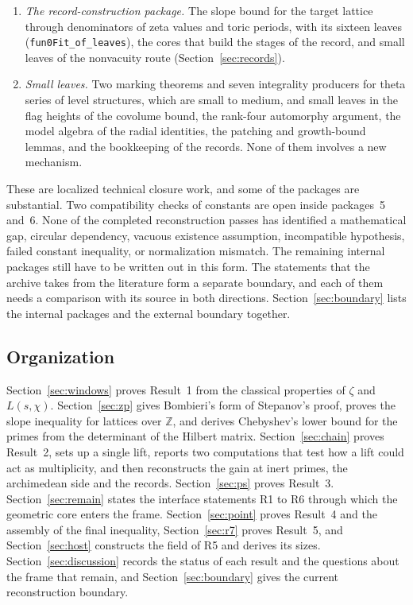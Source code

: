 \documentclass[11pt,letterpaper]{article}
\numberwithin{equation}{section}
\begin{document}
\begin{enumerate}
\item \emph{The record-construction package.} The slope bound for the target lattice through denominators of zeta values and toric periods, with its sixteen leaves (\texttt{fun0Fit\_of\_leaves}), the cores that build the stages of the record, and small leaves of the nonvacuity route (Section~\ref{sec:records}).
\item \emph{Small leaves.} Two marking theorems and seven integrality producers for theta series of level structures, which are small to medium, and small leaves in the flag heights of the covolume bound, the rank-four automorphy argument, the model algebra of the radial identities, the patching and growth-bound lemmas, and the bookkeeping of the records. None of them involves a new mechanism.
\end{enumerate}
These are localized technical closure work, and some of the packages are substantial. Two compatibility checks of constants are open inside packages~5 and~6. None of the completed reconstruction passes has identified a mathematical gap, circular dependency, vacuous existence assumption, incompatible hypothesis, failed constant inequality, or normalization mismatch. The remaining internal packages still have to be written out in this form. The statements that the archive takes from the literature form a separate boundary, and each of them needs a comparison with its source in both directions. Section~\ref{sec:boundary} lists the internal packages and the external boundary together.

\subsection{Organization}

Section~\ref{sec:windows} proves Result~1 from the classical properties of $\zeta$ and $L(s,\chi)$. Section~\ref{sec:zp} gives Bombieri's form of Stepanov's proof, proves the slope inequality for lattices over $\mathbb Z$, and derives Chebyshev's lower bound for the primes from the determinant of the Hilbert matrix. Section~\ref{sec:chain} proves Result~2, sets up a single lift, reports two computations that test how a lift could act as multiplicity, and then reconstructs the gain at inert primes, the archimedean side and the records. Section~\ref{sec:ps} proves Result~3. Section~\ref{sec:remain} states the interface statements R1 to R6 through which the geometric core enters the frame. Section~\ref{sec:point} proves Result~4 and the assembly of the final inequality, Section~\ref{sec:r7} proves Result~5, and Section~\ref{sec:host} constructs the field of R5 and derives its sizes. Section~\ref{sec:discussion} records the status of each result and the questions about the frame that remain, and Section~\ref{sec:boundary} gives the current reconstruction boundary.
\end{document}
